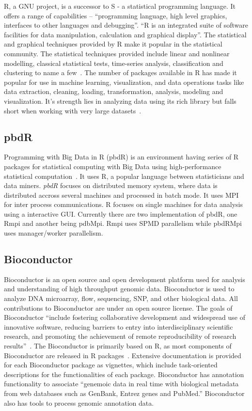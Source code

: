 R, a GNU project, is a successor to S - a statistical programming
language. It offers a range of capabilities – ``programming language,
high level graphics, interfaces to other languages and
debugging''. ``R is an integrated suite of software facilities for
data manipulation, calculation and graphical display''. The
statistical and graphical techniques provided by R make it popular in
the statistical community. The statistical techniques provided include
linear and nonlinear modelling, classical statistical tests,
time-series analysis, classification and clustering to name a
few~\cite{www-R}. The number of packages available in R has made it
popular for use in machine learning, visualization, and data
operations tasks like data extraction, cleaning, loading,
transformation, analysis, modeling and visualization. It's strength
lies in analyzing data using its rich library but falls short when
working with very large datasets~\cite{book-R}.
    
\subsection{pbdR}

Programming with Big Data in R (pbdR) is an environment having series
of R packages for statistical computing with Big Data using
high-performance statistical computation~\cite{www-pbdR}. It uses R, a
popular language between statisticians and data miners. \textit{pbdR} focuses
on distributed memory system, where data is distributed accross
several machines and processed in batch mode. It uses MPI for inter
process communications. R focuses on single machines for data analysis
using a interactive GUI. Currently there are two implementation of
pbdR, one Rmpi and another being pdbMpi.  Rmpi uses SPMD parallelism
while pbdRMpi uses manager/worker parallelism.

    \pv

\subsection{Bioconductor \cv}

Bioconductor is an open source and open development platform used for
analysis and understanding of high throughput genomic
data. Bioconductor is used to analyze DNA microarray, flow,
sequencing, SNP, and other biological data. All contributions to
Bioconductor are under an open source license. The goals of
Bioconductor ``include fostering collaborative development and
widespread use of innovative software, reducing barriers to entry into
interdisciplinary scientific research, and promoting the achievement
of remote reproducibility of research
results''~\cite{bioconductor-article-2004}.  The Bioconductor is
primarily based on R, as most components of Bioconductor are released
in R packages~\cite{www-bioconductor-about}.  Extensive documentation
is provided for each Bioconductor package as vignettes, which include
task-oriented descriptions for the functionalities of each
package. Bioconductor has annotation functionality to associate
``genemoic data in real time with biological metadata from web
databases such as GenBank, Entrez genes and PubMed.''  Bioconductor
also has tools to process genomic annotation data.

